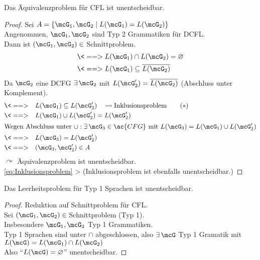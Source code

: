 {\begin{Satz}
	Das Äquivalenzproblem für \ac{CFL} ist unentscheidbar.
\end{Satz}
\begin{proof}
	Sei $A=\{\mcG_1,\mcG_2 \mid L(\mcG_1)=L(\mcG_2)\}$\\
	Angenommen, $\mcG_1,\mcG_2$ sind Typ 2 Grammatiken für \ac{DCFL}.\\
	Dann ist $(\mcG_1,\mcG_2)\in{}$Schnittproblem.
	\begin{align*}
		\<==> L(\mcG_1) &\cap L(\mcG_2)=\varnothing\\
		\<==> L(\mcG_1) &\subseteq \overline{L(\mcG_2)}
	\end{align*}
	Da $\mcG_2$ eine \ac{DCFG} $\exists\,\mcG_2$ mit $L(\mcG'_2)=\overline{L(\mcG_2)}$ (Abschluss unter Komplement).
	\begin{align*}
		\<==>\quad & L(\mcG_1) \subseteq L(\mcG'_2) \quad\leadsto\text{Inklusionsproblem} \tag{$*$}\label{eq:Inklusionsproblem}\\
		\<==>\quad & L(\mcG_1) \cup L(\mcG'_2) = L(\mcG'_2)\\
	\shortintertext{Wegen Abschluss unter $\cup:\exists\,\mcG_3\in\ac{CFG}$ mit $L(\mcG_3)=L(\mcG_1)\cup L(\mcG'_2)$}
		\<==>\quad & L(\mcG_3)=L(\mcG'_2)\\
		\<==>\quad & (\mcG_3,\mcG'_2)\in A
	\end{align*}
	$\curvearrowright$ Äquivalenzproblem ist unentscheidbar.\\
	\eqref{eq:Inklusionsproblem} \-> (Inklusionsproblem ist ebenfalls unentscheidbar.)
\end{proof}

\begin{Satz}
	Das Leerheitsproblem für Typ 1 Sprachen ist unentscheidbar.
\end{Satz}
\begin{proof}
	Reduktion auf Schnittproblem für \ac{CFL}.\\
	Sei $(\mcG_1,\mcG_2)\in{}$Schnittproblem (Typ 1).\\
	Insbesondere $\mcG_1,\mcG_2$ Typ 1 Grammatiken.\\
	Typ 1 Sprachen sind unter $\cap$ abgeschlossen, also $\exists\, \mcG$ Typ 1 Gramatik mit $L(\mcG)=L(\mcG_1)\cap L(\mcG_2)$\\
	Also "`$L(\mcG)=\varnothing$"' unentscheidbar.
\end{proof}
}
